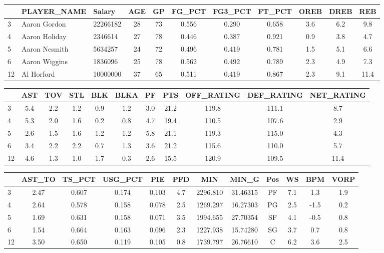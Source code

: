 \documentclass[
]{article}
\begin{document}
\begin{longtable}[]{@{}lllcccccccc@{}}
\toprule()
& PLAYER\_NAME & Salary & AGE & GP & FG\_PCT & FG3\_PCT & FT\_PCT & OREB
& DREB & REB \\
\midrule()
\endhead
3 & Aaron Gordon & 22266182 & 28 & 73 & 0.556 & 0.290 & 0.658 & 3.6 &
6.2 & 9.8 \\
4 & Aaron Holiday & 2346614 & 27 & 78 & 0.446 & 0.387 & 0.921 & 0.9 &
3.8 & 4.7 \\
5 & Aaron Nesmith & 5634257 & 24 & 72 & 0.496 & 0.419 & 0.781 & 1.5 &
5.1 & 6.6 \\
6 & Aaron Wiggins & 1836096 & 25 & 78 & 0.562 & 0.492 & 0.789 & 2.3 &
4.9 & 7.3 \\
12 & Al Horford & 10000000 & 37 & 65 & 0.511 & 0.419 & 0.867 & 2.3 & 9.1
& 11.4 \\
\bottomrule()
\end{longtable}

\begin{longtable}[]{@{}lcccccccccc@{}}
\toprule()
& AST & TOV & STL & BLK & BLKA & PF & PTS & OFF\_RATING & DEF\_RATING &
NET\_RATING \\
\midrule()
\endhead
3 & 5.4 & 2.2 & 1.2 & 0.9 & 1.2 & 3.0 & 21.2 & 119.8 & 111.1 & 8.7 \\
4 & 5.3 & 2.0 & 1.6 & 0.2 & 0.8 & 4.7 & 19.4 & 110.5 & 107.6 & 2.9 \\
5 & 2.6 & 1.5 & 1.6 & 1.2 & 1.2 & 5.8 & 21.1 & 119.3 & 115.0 & 4.3 \\
6 & 3.4 & 2.2 & 2.2 & 0.7 & 1.3 & 3.6 & 21.2 & 115.6 & 110.0 & 5.7 \\
12 & 4.6 & 1.3 & 1.0 & 1.7 & 0.3 & 2.6 & 15.5 & 120.9 & 109.5 & 11.4 \\
\bottomrule()
\end{longtable}

\begin{longtable}[]{@{}lccccccccccc@{}}
\toprule()
& AST\_TO & TS\_PCT & USG\_PCT & PIE & PFD & MIN & MIN\_G & Pos & WS &
BPM & VORP \\
\midrule()
\endhead
3 & 2.47 & 0.607 & 0.174 & 0.103 & 4.7 & 2296.810 & 31.46315 & PF & 7.1
& 1.3 & 1.9 \\
4 & 2.64 & 0.578 & 0.158 & 0.078 & 2.5 & 1269.297 & 16.27303 & PG & 2.5
& -1.5 & 0.2 \\
5 & 1.69 & 0.631 & 0.158 & 0.071 & 3.5 & 1994.655 & 27.70354 & SF & 4.1
& -0.5 & 0.8 \\
6 & 1.54 & 0.664 & 0.163 & 0.096 & 2.3 & 1227.938 & 15.74280 & SG & 3.7
& 0.7 & 0.8 \\
12 & 3.50 & 0.650 & 0.119 & 0.105 & 0.8 & 1739.797 & 26.76610 & C & 6.2
& 3.6 & 2.5 \\
\bottomrule()
\end{longtable}
\end{document}
